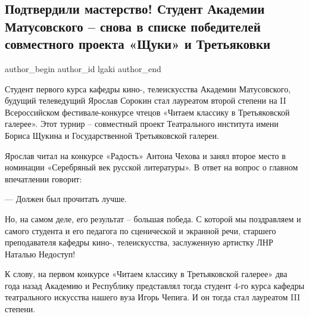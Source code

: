  
 
 
 
 
\subsection{Подтвердили мастерство! Студент Академии Матусовского – снова в списке победителей совместного проекта «Щуки» и Третьяковки}
\label{sec:24_11_2021.stz.edu.lnr.lgaki.1.konkurs_trevjakovka}


\ifcmt
 author_begin
   author_id lgaki
 author_end
\fi

Студент первого курса кафедры кино-, телеискусства Академии Матусовского,
будущий телеведущий Ярослав Сорокин стал лауреатом второй степени на II
Всероссийском фестивале-конкурсе чтецов «Читаем классику в Третьяковской
галерее». Этот турнир – совместный проект Театрального института имени Бориса
Щукина и Государственной Третьяковской галереи.

Ярослав читал на конкурсе «Радость» Антона Чехова и занял второе место в
номинации «Серебряный век русской литературы». В ответ на вопрос о главном
впечатлении говорит:

— Должен был прочитать лучше.

Но, на самом деле, его результат – большая победа. С которой мы поздравляем и
самого студента и его педагога по сценической и экранной речи, старшего
преподавателя кафедры кино-, телеискусства, заслуженную артистку ЛНР Наталью
Недоступ!


К слову, на первом конкурсе «Читаем классику в Третьяковской галерее» два года
назад Академию и Республику представлял тогда студент 4-го курса кафедры
театрального искусства нашего вуза Игорь Чепига. И он тогда стал лауреатом III
степени.

